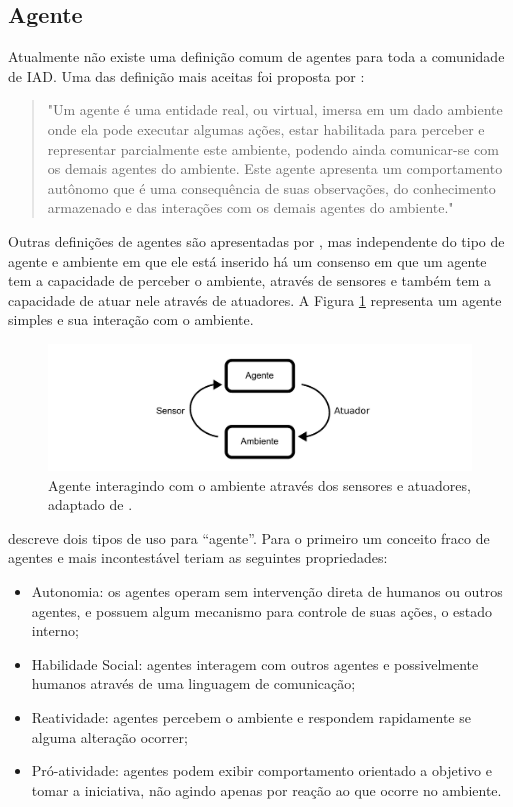 \subsection{Agente}

Atualmente não existe uma definição comum de agentes para toda a comunidade de IAD. Uma das definição mais aceitas foi proposta por \citet{ferber1991agent}:
\begin{quotation}
"Um agente é uma entidade real, ou virtual, imersa em um dado ambiente onde ela pode executar algumas ações, estar habilitada para perceber e representar parcialmente este ambiente, podendo ainda comunicar-se com os demais agentes do ambiente. Este agente apresenta um comportamento autônomo que é uma consequência de suas observações, do conhecimento armazenado e das interações com os demais agentes do ambiente."
\end{quotation}

Outras definições de agentes são apresentadas por \cite{wooldridge1995intelligent,franklin1996agent,russell2002artificial}, mas independente do tipo de agente e ambiente em que ele está inserido há um consenso em que um agente tem a capacidade de perceber o ambiente, através de sensores e também tem a capacidade de atuar nele através de atuadores. A Figura \ref{fig:agente} representa um agente simples e sua interação com o ambiente.

\begin{figure}[ht]
\centering
\includegraphics[scale=0.8]{imagens/agente.pdf}
\caption{Agente interagindo com o ambiente através dos sensores e atuadores, adaptado de \cite{russell2002artificial}.}
\label{fig:agente}
\end{figure}

\citet{wooldridge1995intelligent} descreve dois tipos de uso para “agente”. Para o primeiro um conceito fraco de agentes e mais incontestável teriam as seguintes propriedades:

\begin{itemize}
\item Autonomia: os agentes operam sem intervenção direta de humanos ou outros agentes, e possuem algum mecanismo para controle de suas ações, o estado interno;
\item Habilidade Social: agentes interagem com outros agentes e possivelmente humanos através de uma linguagem de comunicação;
\item Reatividade: agentes percebem o ambiente e respondem rapidamente se alguma alteração ocorrer;
\item Pró-atividade: agentes podem exibir comportamento orientado a objetivo e tomar a iniciativa, não agindo apenas por reação ao que ocorre no ambiente.
\end{itemize}

